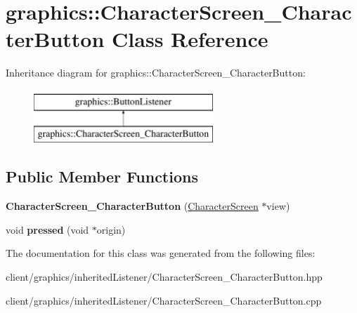 \hypertarget{classgraphics_1_1_character_screen___character_button}{\section{graphics\-:\-:Character\-Screen\-\_\-\-Character\-Button Class Reference}
\label{classgraphics_1_1_character_screen___character_button}
}
Inheritance diagram for graphics\-:\-:Character\-Screen\-\_\-\-Character\-Button\-:\begin{figure}[H]
\begin{center}
\leavevmode
\includegraphics[height=2.000000cm]{classgraphics_1_1_character_screen___character_button}
\end{center}
\end{figure}
\subsection*{Public Member Functions}
\begin{DoxyCompactItemize}
\item 
\hypertarget{classgraphics_1_1_character_screen___character_button_ab62f615c2f4fffd0782d08597d5edbdb}{{\bfseries Character\-Screen\-\_\-\-Character\-Button} (\hyperlink{classgraphics_1_1_character_screen}{Character\-Screen} $\ast$view)}\label{classgraphics_1_1_character_screen___character_button_ab62f615c2f4fffd0782d08597d5edbdb}

\item 
\hypertarget{classgraphics_1_1_character_screen___character_button_a48a8bc766bf00fadd97777fa6b53d3af}{void {\bfseries pressed} (void $\ast$origin)}\label{classgraphics_1_1_character_screen___character_button_a48a8bc766bf00fadd97777fa6b53d3af}

\end{DoxyCompactItemize}


The documentation for this class was generated from the following files\-:\begin{DoxyCompactItemize}
\item 
client/graphics/inherited\-Listener/Character\-Screen\-\_\-\-Character\-Button.\-hpp\item 
client/graphics/inherited\-Listener/Character\-Screen\-\_\-\-Character\-Button.\-cpp\end{DoxyCompactItemize}
